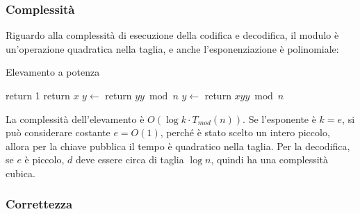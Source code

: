 \subsubsection{Complessità}

Riguardo alla complessità di esecuzione della codifica e decodifica, il modulo è un'operazione quadratica nella taglia, e anche l'esponenziazione è polinomiale:
\begin{algorithm}[H]
\caption{Elevamento a potenza}\label{alg:power}
\begin{algorithmic}[1]
            \State return 1
        \EndIf
            \State return $x$
        \EndIf
            \State $y \gets$ 
            \State return $y y \bmod n $
        \Else
            \State $y \gets$ 
            \State return $x y y \bmod n $
        \EndIf
    \EndProcedure
\end{algorithmic}
\end{algorithm}
La complessità dell'elevamento è $
O \left( 
    \log k
    \cdot
    T_{mod}(n)
\right)
$. Se l'esponente è $k=e$, si può considerare costante $e = O(1)$, perché è stato scelto un intero piccolo,
allora per la chiave pubblica il tempo è quadratico nella taglia.
Per la decodifica, se $e$ è piccolo, $d$ deve essere circa di taglia $\log n$, quindi ha una complessità cubica.

\subsubsection{Correttezza}

